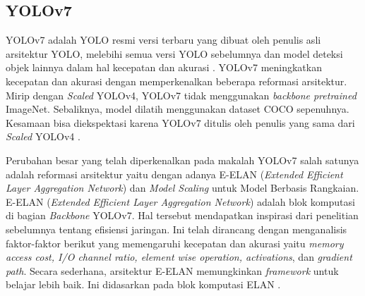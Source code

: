 \subsection{YOLOv7}
\label{subsec:yolov7}

\par YOLOv7 adalah YOLO resmi versi terbaru yang dibuat oleh penulis asli arsitektur YOLO, melebihi semua versi YOLO sebelumnya dan model deteksi objek lainnya dalam hal kecepatan dan akurasi \cite{wang2022yolov7}. YOLOv7 meningkatkan kecepatan dan akurasi dengan memperkenalkan beberapa reformasi arsitektur. Mirip dengan \textit{Scaled} YOLOv4, YOLOv7 tidak menggunakan \textit{backbone pretrained} ImageNet. Sebaliknya, model dilatih menggunakan dataset COCO sepenuhnya. Kesamaan bisa diekspektasi karena YOLOv7 ditulis oleh penulis yang sama dari \textit{Scaled} YOLOv4 \cite{yolov7explain}.

Perubahan besar yang telah diperkenalkan pada makalah YOLOv7 salah satunya adalah reformasi arsitektur yaitu dengan adanya E-ELAN (\textit{Extended Efficient Layer Aggregation Network}) dan \textit{Model Scaling} untuk Model Berbasis Rangkaian. E-ELAN (\textit{Extended Efficient Layer Aggregation Network}) adalah blok komputasi di bagian \textit{Backbone} YOLOv7. Hal tersebut mendapatkan inspirasi dari penelitian sebelumnya tentang efisiensi jaringan. Ini telah dirancang dengan menganalisis faktor-faktor berikut yang memengaruhi kecepatan dan akurasi yaitu \textit{memory access cost, I/O channel ratio, element wise operation, activations}, dan \textit{gradient path}. Secara sederhana, arsitektur E-ELAN memungkinkan \textit{framework} untuk belajar lebih baik. Ini didasarkan pada blok komputasi ELAN \cite{yolov7explain}.